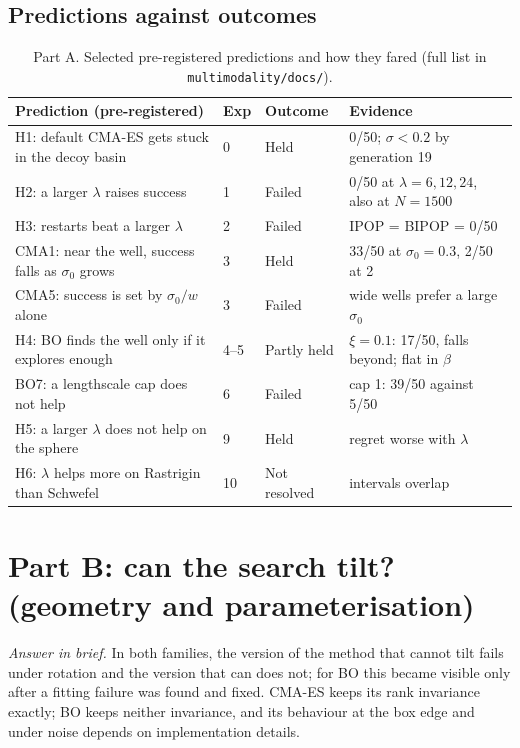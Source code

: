 \documentclass[10pt,a4paper]{article}
\begin{document}
\subsection{Predictions against outcomes}
\begin{table}[h]
\centering\footnotesize
\begin{tabular}{p{6.0cm}lp{1.9cm}p{6.0cm}}
\toprule
Prediction (pre-registered) & Exp & Outcome & Evidence \\
\midrule
H1: default CMA-ES gets stuck in the decoy basin & 0 & Held & 0/50; $\sigma<0.2$ by generation 19 \\
H2: a larger $\lambda$ raises success & 1 & Failed & 0/50 at $\lambda=6,12,24$, also at $N=1500$ \\
H3: restarts beat a larger $\lambda$ & 2 & Failed & IPOP = BIPOP = 0/50 \\
CMA1: near the well, success falls as $\sigma_0$ grows & 3 & Held & 33/50 at $\sigma_0=0.3$, 2/50 at 2 \\
CMA5: success is set by $\sigma_0/w$ alone & 3 & Failed & wide wells prefer a large $\sigma_0$ \\
H4: BO finds the well only if it explores enough & 4--5 & Partly held & $\xi=0.1$: 17/50, falls beyond; flat in $\beta$ \\
BO7: a lengthscale cap does not help & 6 & Failed & cap 1: 39/50 against 5/50 \\
H5: a larger $\lambda$ does not help on the sphere & 9 & Held & regret worse with $\lambda$ \\
H6: $\lambda$ helps more on Rastrigin than Schwefel & 10 & Not resolved & intervals overlap \\
\bottomrule
\end{tabular}
\caption{Part A. Selected pre-registered predictions and how they fared (full list in \texttt{multimodality/docs/}).}
\end{table}

\section{Part B: can the search tilt? (geometry and parameterisation)}\label{sec:partB}
\emph{Answer in brief.} In both families, the version of the method that cannot tilt fails under rotation and the
version that can does not; for BO this became visible only after a fitting failure was found and fixed. CMA-ES keeps
its rank invariance exactly; BO keeps neither invariance, and its behaviour at the box edge and under noise depends
on implementation details.
\end{document}
